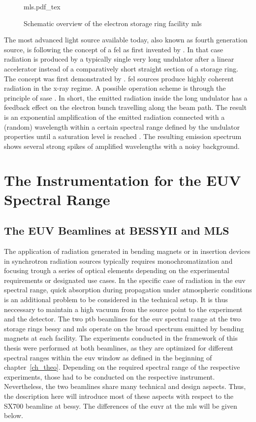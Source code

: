 \begin{figure}[htb]
    \def\svgwidth{0.7\textwidth}
    {mls.pdf_tex}
    \caption[Schematic overview of the MLS]{Schematic overview of the electron storage ring facility \gls{mls}}
    \label{ch_exp:fig_mls}
\end{figure}


The most advanced light source available today, also known as fourth generation source, is following the concept of a \gls{fel} as first invented by \textcite{madey_stimulated_1971}. In that case radiation is produced by a typically single very long undulator after a linear accelerator instead of a comparatively short straight section of a storage ring. The concept was first demonstrated by \textcite{deacon_first_1977}. \Gls{fel} sources produce highly coherent radiation in the x-ray regime. A possible operation scheme is through the principle of \gls{sase} \cite{derbenev_possibility_1982, bonifacio_collective_1984}. In short, the emitted radiation inside the long undulator has a feedback effect on the electron bunch travelling along the beam path. The result is an exponential amplification of the emitted radiation connected with a (random) wavelength within a certain spectral range defined by the undulator properties until a saturation level is reached \cite{milton_exponential_2001}. The resulting emission spectrum shows several strong spikes of amplified wavelengths with a noisy background.

\section{The Instrumentation for the EUV Spectral Range}
\subsection{The EUV Beamlines at BESSYII and MLS}
The application of radiation generated in bending magnets or in insertion devices in synchrotron radiation sources typically requires monochromatization and focusing trough a series of optical elements depending on the experimental requirements or designated use cases. In the specific case of radiation in the \gls{euv} spectral range, quick absorption during propagation under atmospheric conditions is an additional problem to be considered in the technical setup. It is thus neccessary to maintain a high vacuum from the source point to the experiment and the detector. The two \gls{ptb} beamlines for the \gls{euv} spectral range at the two storage rings \gls{bessy} and \gls{mls} operate on the broad spectrum emitted by bending magnets at each facility. The experiments conducted in the framework of this thesis were performed at both beamlines, as they are optimized for different spectral ranges within the \gls{euv} window as defined in the beginning of chapter~\ref{ch_theo}.  Depending on the required spectral range of the respective experiments, those had to be conducted on the respective instrument. Nevertheless, the two beamlines share many technical and design aspects. Thus, the description here will introduce most of these aspects with respect to the SX700 beamline at \gls{bessy}. The differences of the \gls{euvr} at the \gls{mls} will be given below.

